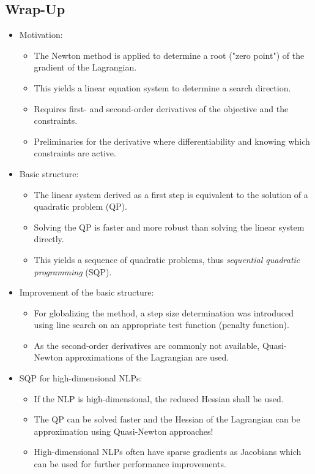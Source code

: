 		\subsection{Wrap-Up}
			\begin{itemize}
				\item Motivation:
					\begin{itemize}
						\item The Newton method is applied to determine a root ("zero point") of the gradient of the Lagrangian.
						\item This yields a linear equation system to determine a search direction.
						\item Requires first- and second-order derivatives of the objective and the constraints.
						\item Preliminaries for the derivative where differentiability and knowing which constraints are active.
					\end{itemize}
				\item Basic structure:
					\begin{itemize}
						\item The linear system derived as a first step is equivalent to the solution of a quadratic problem (QP).
						\item Solving the QP is faster and more robust than solving the linear system directly.
						\item This yields a sequence of quadratic problems, thus \emph{sequential quadratic programming} (SQP).
					\end{itemize}
				\item Improvement of the basic structure:
					\begin{itemize}
						\item For globalizing the method, a step size determination was introduced using line search on an appropriate test function (penalty function).
						\item As the second-order derivatives are commonly not available, Quasi-Newton approximations of the Lagrangian are used.
					\end{itemize}
				\item SQP for high-dimensional NLPs:
					\begin{itemize}
						\item If the NLP is high-dimensional, the reduced Hessian shall be used.
						\item The QP can be solved faster and the Hessian of the Lagrangian can be approximation using Quasi-Newton approaches!
						\item High-dimensional NLPs often have sparse gradients as Jacobians which can be used for further performance improvements.

\end{itemize}
\end{itemize}
